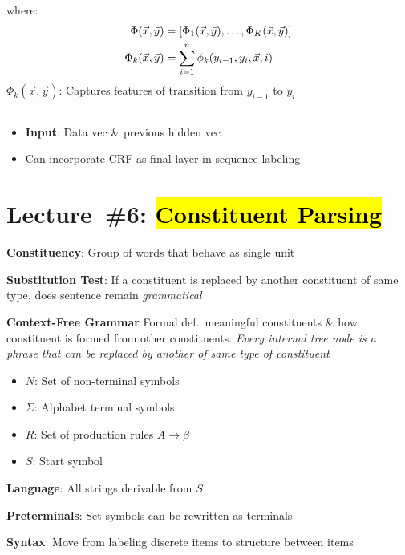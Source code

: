 \documentclass[8pt]{extarticle}
\renewcommand{\green}[1]{{\color{ForestGreen} #1}}
\newcommand{\greenbf}[1]{\textbf{\green{#1}}}
\begin{document}
\begin{multicols}{3}
  where:
  \begin{align*}
      \Phi(\vec{x},\vec{y}) &= \lbrack\Phi_{1}(\vec{x},\vec{y}),\ldots,\Phi_{K}(\vec{x},\vec{y})\rbrack \\
      \Phi_{k}(\vec{x},\vec{y}) &= \sum_{i=1}^{n} \phi_{k}(y_{i-1},y_{i},\vec{x},i)
  \end{align*}
  $\Phi_{k}(\vec{x},\vec{y})$: Captures features of transition from $y_{i-1}$ to $y_i$

  \subsection*{}

  \begin{itemize}
    \item \textbf{Input}: Data vec \& previous hidden vec
    \item Can incorporate CRF as final layer in sequence labeling
  \end{itemize}

  \section*{Lecture~\#6: \hl{Constituent Parsing}}

  \greenbf{Constituency}: Group of words that behave as single unit

  \greenbf{Substitution Test}: If a constituent is replaced by another constituent of same type, does sentence remain \textit{grammatical}

  \greenbf{Context-Free Grammar} Formal def.\ meaningful constituents \& how constituent is formed from other constituents.  \textit{Every internal tree node is a phrase that can be replaced by another of same type of constituent}
  \begin{itemize}
    \item $N$: Set of non-terminal symbols
    \item $\Sigma$: Alphabet terminal symbols
    \item $R$: Set of production rules $A \rightarrow \beta$
    \item $S$: Start symbol
  \end{itemize}

  \textbf{Language}: All strings derivable from $S$

  \textbf{Preterminals}: Set symbols can be rewritten as terminals

  \textbf{Syntax}: Move from labeling discrete items to structure between items


\end{multicols}
\end{document}
